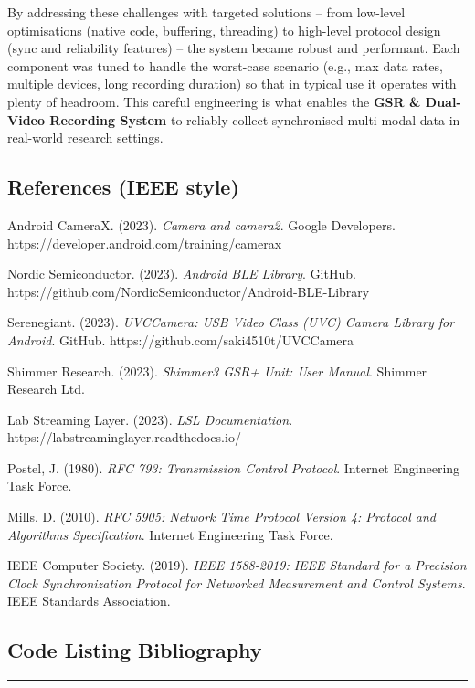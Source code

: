 \documentclass[12pt,a4paper]{article}
\begin{document}
By addressing these challenges with targeted solutions -- from low-level optimisations (native code, buffering, threading) to high-level protocol design (sync and reliability features) -- the system became robust and performant. Each component was tuned to handle the worst-case scenario (e.g., max data rates, multiple devices, long recording duration) so that in typical use it operates with plenty of headroom. This careful engineering is what enables the \textbf{GSR \& Dual-Video Recording System} to reliably collect synchronised multi-modal data in real-world research settings.

\subsection{References (IEEE style)}\label{references-ieee-style}

Android CameraX. (2023). \emph{Camera and camera2}. Google Developers. https://developer.android.com/training/camerax

Nordic Semiconductor. (2023). \emph{Android BLE Library}. GitHub. https://github.com/NordicSemiconductor/Android-BLE-Library

Serenegiant. (2023). \emph{UVCCamera: USB Video Class (UVC) Camera Library for Android}. GitHub. https://github.com/saki4510t/UVCCamera

Shimmer Research. (2023). \emph{Shimmer3 GSR+ Unit: User Manual}. Shimmer Research Ltd.

Lab Streaming Layer. (2023). \emph{LSL Documentation}. https://labstreaminglayer.readthedocs.io/

Postel, J. (1980). \emph{RFC 793: Transmission Control Protocol}. Internet Engineering Task Force.

Mills, D. (2010). \emph{RFC 5905: Network Time Protocol Version 4: Protocol and Algorithms Specification}. Internet Engineering Task Force.

IEEE Computer Society. (2019). \emph{IEEE 1588-2019: IEEE Standard for a Precision Clock Synchronization Protocol for Networked Measurement and Control Systems}. IEEE Standards Association.

\subsection{Code Listing Bibliography}\label{code-listing-bibliography}

\begin{center}\rule{0.5\linewidth}{0.5pt}\end{center}
\end{document}
